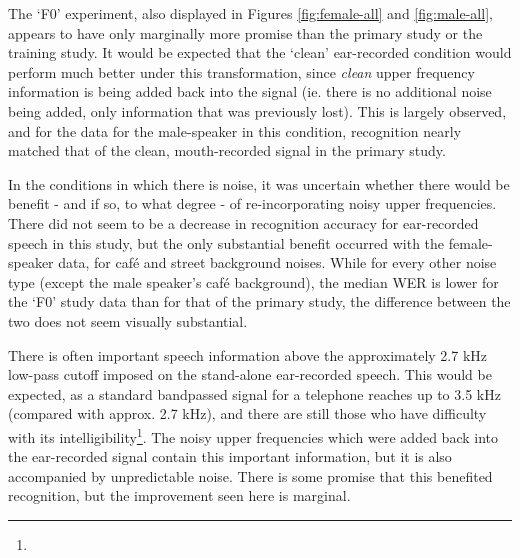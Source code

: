 % 


The `F0' experiment, also displayed in Figures \ref{fig:female-all} and \ref{fig:male-all}, appears to have only marginally more promise than the primary study or the training study.  It would be expected that the `clean' ear-recorded condition would perform much better under this transformation, since \textit{clean} upper frequency information is being added back into the signal (ie. there is no additional noise being added, only information that was previously lost).  This is largely observed, and for the data for the male-speaker in this condition, recognition nearly matched that of the clean, mouth-recorded signal in the primary study.

In the conditions in which there is noise, it was uncertain whether there would be benefit - and if so, to what degree - of re-incorporating noisy upper frequencies.  There did not seem to be a decrease in recognition accuracy for ear-recorded speech in this study, but the only substantial benefit occurred with the female-speaker data, for caf\'{e} and street background noises.  While for every other noise type (except the male speaker's caf\'{e} background), the median WER is lower for the `F0' study data than for that of the primary study, the difference between the two does not seem visually substantial.

There is often important \DIFdelbegin {}\DIFdelend speech information above the approximately 2.7 kHz low-pass cutoff imposed on the stand-alone ear-recorded speech.  This would be expected, as a standard bandpassed signal for a telephone reaches up to 3.5 kHz (compared with approx. 2.7 kHz), and there are still those who have difficulty with its intelligibility\DIFaddbegin \footnote{}\DIFaddend .  The noisy upper frequencies which were added back into the ear-recorded signal contain this important information, but it is also accompanied by unpredictable noise.  There is some promise that this benefited recognition, but the improvement seen here is \DIFdelbegin {}\DIFdelend marginal.

